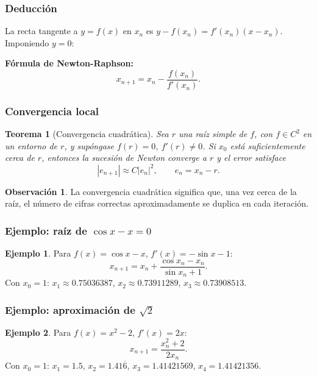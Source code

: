 \documentclass[a4paper,12pt]{article}
\theoremstyle{definition}
\newtheorem{ejemplo}{Ejemplo}[section]
\newtheorem{observacion}{Observación}[section]
\theoremstyle{plain}
\newtheorem{teorema}{Teorema}[section]
\begin{document}
\subsubsection{Deducción}

La recta tangente a $y=f(x)$ en $x_n$ es
$y-f(x_n)=f'(x_n)(x-x_n)$.
Imponiendo $y=0$:

\begin{cajaresultado}
\textbf{Fórmula de Newton-Raphson:}
\[
x_{n+1}=x_n-\frac{f(x_n)}{f'(x_n)}.
\]
\end{cajaresultado}

\subsubsection{Convergencia local}

\begin{teorema}[Convergencia cuadrática]
Sea $r$ una raíz simple de $f$, con $f\in C^2$ en un entorno de $r$, y
supóngase $f(r)=0$, $f'(r)\neq 0$. Si $x_0$ está suficientemente cerca de $r$,
entonces la sucesión de Newton converge a $r$ y el error satisface
\[
|e_{n+1}| \approx C |e_n|^2, \qquad e_n=x_n-r.
\]
\end{teorema}

\begin{observacion}
La convergencia cuadrática significa que, una vez cerca de la raíz, el número
de cifras correctas aproximadamente se duplica en cada iteración.
\end{observacion}

\subsubsection{Ejemplo: raíz de $\cos x-x=0$}

\begin{ejemplo}
Para $f(x)=\cos x - x$, $f'(x)=-\sin x -1$:
\[
x_{n+1}=x_n+\frac{\cos x_n - x_n}{\sin x_n +1}.
\]
Con $x_0=1$: $x_1\approx 0.75036387$, $x_2\approx 0.73911289$,
$x_3\approx 0.73908513$.
\end{ejemplo}

\subsubsection{Ejemplo: aproximación de $\sqrt{2}$}

\begin{ejemplo}
Para $f(x)=x^2-2$, $f'(x)=2x$:
\[
x_{n+1}=\frac{x_n^2+2}{2x_n}.
\]
Con $x_0=1$: $x_1=1.5$, $x_2=1.41\overline{6}$, $x_3=1.41421569$,
$x_4=1.41421356$.
\end{ejemplo}
\end{document}
